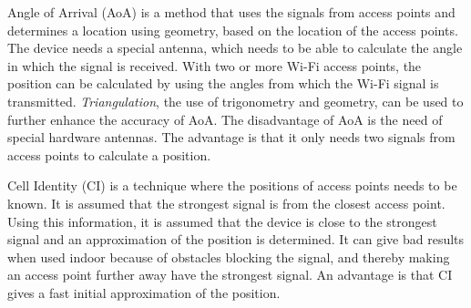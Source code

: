 Angle of Arrival (AoA) is a method that uses the signals from access points and determines a location using geometry, based on the location of the access points. 
The device needs a special antenna, which needs to be able to calculate the angle in which the signal is received.
With two or more Wi-Fi access points, the position can be calculated by using the angles from which the Wi-Fi signal is transmitted.
\textit{Triangulation}, the use of trigonometry and geometry, can be used to further enhance the accuracy of AoA. 
The disadvantage of AoA is the need of special hardware antennas.  
The advantage is that it only needs two signals from access points to calculate a position.
 
Cell Identity (CI) is a technique where the positions of access points needs to be known. 
It is assumed that the strongest signal is from the closest access point.
Using this information, it is assumed that the device is close to the strongest signal and an approximation of the position is determined. 
It can give bad results when used indoor because of obstacles blocking the signal, and thereby making an access point further away have the strongest signal.
An advantage is that CI gives a fast initial approximation of the position.